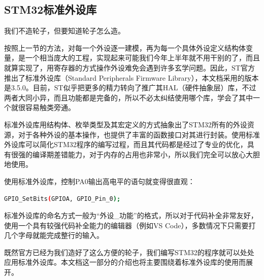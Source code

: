 \subsection{STM32标准外设库}
我们不造轮子，但要知道轮子怎么造。
\par 
按照上一节的方法，对每一个外设逐一建模，再为每一个具体外设定义结构体变量，是一个相当庞大的工程，实现起来可能我们今年上半年就不用干别的了，而且就算实现了，用寄存器的方式操作外设难免会遇到许多玄学问题。因此，ST官方推出了标准外设库（Standard Peripherals Firmware Library），本文档采用的版本是3.5.0。目前，ST似乎把更多的精力转向了推广其\acs{HAL}（硬件抽象层）库，不过两者大同小异，而且功能都是完备的，所以不必太纠结使用哪个库，学会了其中一个就很容易触类旁通。
\par 
标准外设库用结构体、枚举类型及其宏定义的方式抽象出了STM32所有的外设资源，对于各种外设的基本操作，也提供了丰富的函数接口对其进行封装。使用标准外设库可以简化STM32程序的编写过程，而且其代码都是经过了专业的优化，具有很强的编译期差错能力，对于内存的占用也非常小，所以我们完全可以放心大胆地使用。
\par 
使用标准外设库，控制PA0输出高电平的语句就变得很直观：
\par
\begin{lstlisting}[language=bash, style=customStyleC, caption=控制PA0输出高电平]
GPIO_SetBits(GPIOA, GPIO_Pin_0);
\end{lstlisting}
\par
标准外设库的命名方式一般为“外设\_功能”的格式，所以对于代码补全非常友好，使用一个具有较强代码补全能力的编辑器（例如VS Code），多数情况下只需要打几个字母就能完成整行的输入。
\par 
既然官方已经为我们造好了这么方便的轮子，我们编写STM32的程序就可以处处应用标准外设库。本文档这一部分的介绍也将主要围绕着标准外设库的使用而展开。

